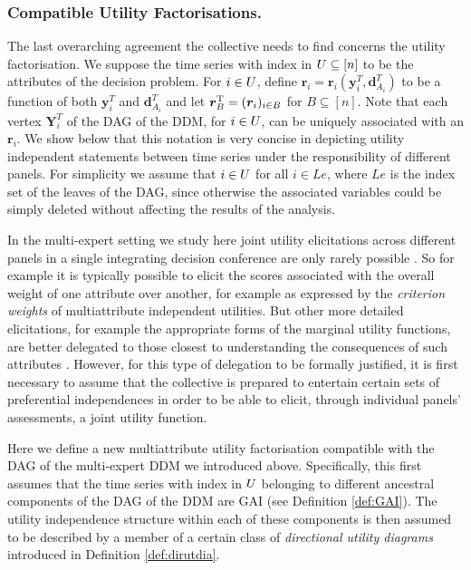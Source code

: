 \subsubsection{Compatible Utility Factorisations.}
\label{sec:comput}
The last overarching agreement the collective needs to find concerns the utility factorisation. We suppose the time series with index in $U\subseteq[n]$ to be the attributes of the decision problem. For $i\in U$, define $\bm{r}_i=\bm{r}_i\left(\bm{y}^T_i,\bm{d}^T_{A_i}\right)$ to be a function of both $\bm{y}^T_i$  and $\bm{d}^T_{A_i}$ and let $\bm{r}_{B}^{\textnormal{T}}=(\bm{r}_i)_{i\in B}$ for $B\subseteq[n]$. Note that each vertex $\bm{Y}^T_i$ of the DAG of the DDM, for $i\in U$, can be uniquely associated with an $\bm{r}_i$.  We show below that this notation is very  concise in depicting utility independent statements between time series under the responsibility of different panels. For simplicity we assume that $i\in U$ for all  $i\in Le$, where $Le$ is the index set  of the leaves of the DAG, since otherwise the associated variables could be simply deleted without affecting the results of the analysis.

In the multi-expert setting we study here joint utility elicitations across different panels in a single integrating decision conference are only rarely possible \citep[see e.g. Chapter 11 of][and our review in Section \ref{sec:decconf}]{French2009}. So for example it is typically possible to elicit the scores associated with the overall weight of one attribute over another, for example as expressed by the \textit{criterion weights} of multiattribute independent utilities. But other more detailed elicitations, for example the appropriate forms of the marginal utility functions, are better delegated to those closest to understanding the consequences of such attributes \citep[for an illustration of why this is so, see][]{von1986}. However, for this type of delegation to be formally justified, it is first necessary to assume that the collective is prepared to entertain certain sets of preferential independences in order to be able to elicit, through individual panels' assessments, a joint utility function. 

Here we define a new multiattribute utility factorisation compatible with the DAG of the multi-expert DDM we introduced above. Specifically, this first assumes that the time series with index in $U$ belonging to different ancestral components of the DAG of the DDM are GAI (see Definition \ref{def:GAI}). The utility independence structure within each of these components is then assumed to be described by a member of a certain class of \textit{directional utility diagrams} introduced in Definition \ref{def:dirutdia}.

